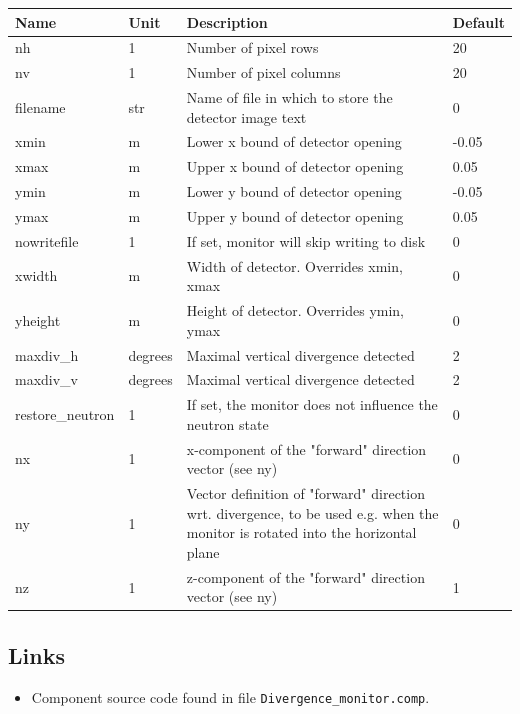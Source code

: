 \begin{longtable}{p{}p{}p{}p{}}
\toprule
\textbf{Name} & \textbf{Unit} & \textbf{Description} & \textbf{Default} \\
\midrule
\endhead
nh & 1 & Number of pixel rows & 20 \\
nv & 1 & Number of pixel columns & 20 \\
filename & str & Name of file in which to store the detector image text & 0 \\
xmin & m & Lower x bound of detector opening & -0.05 \\
xmax & m & Upper x bound of detector opening & 0.05 \\
ymin & m & Lower y bound of detector opening & -0.05 \\
ymax & m & Upper y bound of detector opening & 0.05 \\
nowritefile & 1 & If set, monitor will skip writing to disk & 0 \\
xwidth & m & Width of detector. Overrides xmin, xmax & 0 \\
yheight & m & Height of detector. Overrides ymin, ymax & 0 \\
maxdiv\_h & degrees & Maximal vertical divergence detected & 2 \\
maxdiv\_v & degrees & Maximal vertical divergence detected & 2 \\
restore\_neutron & 1 & If set, the monitor does not influence the neutron state & 0 \\
nx & 1 & x-component of the "forward" direction vector (see ny) & 0 \\
ny & 1 & Vector definition of "forward" direction wrt. divergence, to be used e.g. when the monitor is rotated into the horizontal plane & 0 \\
nz & 1 & z-component of the "forward" direction vector (see ny) & 1 \\
\bottomrule
\end{longtable}

\subsection*{Links}
\begin{itemize}
  \item Component source code found in file \texttt{Divergence\_monitor.comp}.
\end{itemize}
